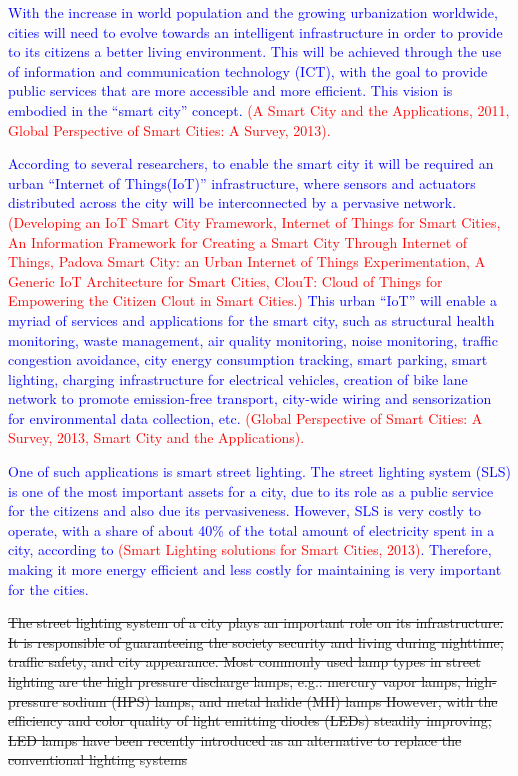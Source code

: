 \documentclass[authoryear,preprint,review,12pt]{elsarticle}
\newcommand{\rev}{\textcolor{blue}}
\newcommand{\refs}{\textcolor{red}}
\begin{document}
\rev{With  the increase in world population and the growing urbanization worldwide, cities will need to evolve towards an intelligent infrastructure in order to provide to its citizens a better living environment. This will be achieved through the use of information and communication technology (ICT), with the goal to provide public services that are more accessible and more efficient. This vision is embodied in the ``smart city'' concept. \refs{(A Smart City and the Applications, 2011, Global Perspective of Smart Cities: A Survey, 2013).}} 

\rev{According to several researchers, to enable the smart city it will be required an urban ``Internet of Things(IoT)'' infrastructure, where sensors and actuators distributed across the city will be interconnected by a pervasive network. \refs{(Developing an IoT Smart City Framework, Internet of Things for Smart Cities, An Information Framework for Creating a Smart City Through Internet of Things, Padova Smart City: an Urban Internet of Things Experimentation, A Generic IoT Architecture for Smart Cities, ClouT: Cloud of Things for Empowering the Citizen Clout in Smart Cities.)} This urban ``IoT'' will enable a myriad of services and applications for the smart city, such as structural health monitoring, waste management, air quality monitoring, noise monitoring, traffic congestion avoidance, city energy consumption tracking, smart parking, smart lighting, charging infrastructure for electrical vehicles, creation of bike lane network to promote emission-free transport, city-wide wiring and sensorization for environmental data collection, etc. \refs{(Global Perspective of Smart Cities: A Survey, 2013, Smart City and the Applications).}}

\rev{One of such applications is smart street lighting. The street lighting system (SLS) is one of the most important assets for a city, due to its role as a public service for the citizens and also due its pervasiveness. However, SLS is very costly to operate, with a share of about 40\% of the total amount of electricity spent in a city, according to \refs{(Smart Lighting solutions for Smart Cities, 2013)}. Therefore, making it more energy efficient and less costly for maintaining is very important for the cities.}

\sout{The street lighting system of a city plays an important role on its infrastructure. It is responsible of guaranteeing the society security and living during nighttime, traffic safety, and city appearance. Most commonly used lamp types in street lighting are the high pressure discharge lamps, e.g.: mercury vapor lamps, high-pressure sodium (HPS) lamps, and metal halide (MH) lamps %
However, with the efficiency and color quality of light emitting diodes (LEDs) steadily improving, LED lamps have been recently introduced as an alternative to replace the conventional lighting systems %
} 
\end{document}
